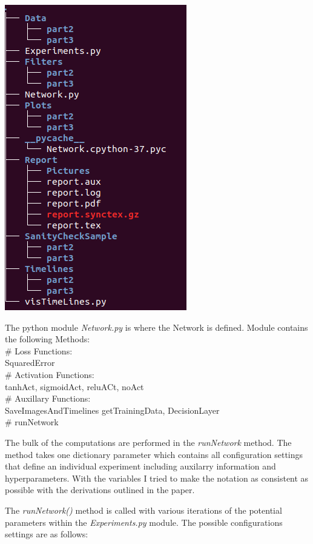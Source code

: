 \documentclass{article}
\begin{document}
\includegraphics[scale=.5]{Pictures/Tree.png}


The python module {\it Network.py} is where the Network is defined. Module contains the following Methods:\\
\# Loss Functions:\\
SquaredError\\
\# Activation Functions:\\
 tanhAct, sigmoidAct, reluACt, noAct\\
\# Auxillary Functions:\\
 SaveImagesAndTimelines
 getTrainingData, DecisionLayer\\
\# runNetwork 

The bulk of the computations are performed in the {\it runNetwork} method.   The method takes one dictionary parameter which contains all configuration settings that define an individual experiment including auxilarry information and hyperparameters. With the variables I tried to make the notation as consistent as possible with the derivations outlined in the paper. 

The {\it runNetwork()} method is called with various iterations of the potential parameters within the {\it Experiments.py} module. 
The possible configurations settings are as follows:
\end{document}
